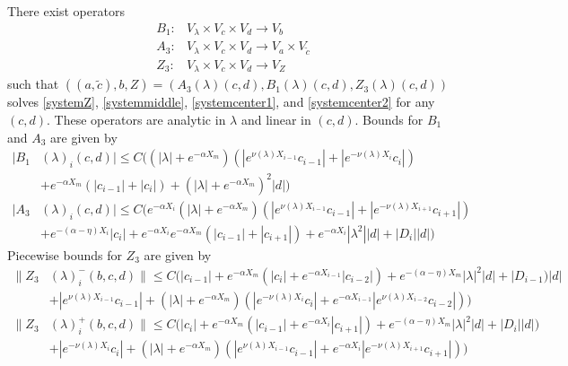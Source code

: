 \documentclass[thesis.tex]{subfiles}
\begin{document}
\begin{lemma}\label{Zinv2}
There exist operators
\begin{align*}
B_1: &V_\lambda \times V_c \times V_d \rightarrow V_b \\
A_3: &V_\lambda \times V_c \times V_d \rightarrow V_a \times V_{\tilde{c}} \\
Z_3: &V_\lambda \times V_c \times V_d \rightarrow V_Z
\end{align*}
such that $( (a, \tilde{c}) , b, Z ) = ( A_3(\lambda)(c, d), B_1(\lambda)(c, d), Z_3(\lambda)(c, d) )$ solves \eqref{systemZ}, \eqref{systemmiddle}, \eqref{systemcenter1}, and \eqref{systemcenter2} for any $(c, d)$. These operators are analytic in $\lambda$ and linear in $(c, d)$. Bounds for $B_1$ and $A_3$ are given by
\begin{align}
|B_1&(\lambda)_i(c, d)| \leq C \Big( (|\lambda| + e^{-\alpha X_m})(|e^{\nu(\lambda)X_{i-1}} c_{i-1}| + |e^{-\nu(\lambda)X_i} c_i|) \nonumber \\
&+ e^{-\alpha X_m}(|c_{i-1}| + |c_i|) + (|\lambda| + e^{-\alpha X_m})^2 |d|  \Big)\label{B1bound} \\
|A_3&(\lambda)_i(c, d)|
\leq C \Big(  
e^{-\alpha X_i} (|\lambda| + e^{-\alpha X_m})(|e^{\nu(\lambda)X_{i-1}} c_{i-1}| + |e^{-\nu(\lambda)X_{i+1}}c_{i+1}|) \nonumber \\
&+ e^{-(\alpha - \eta)X_i}|c_i| + e^{-\alpha X_i} e^{-\alpha X_m}(|c_{i-1}| + |c_{i+1}|) + e^{-\alpha X_i} |\lambda^2||d| + |D_i||d| \Big) \label{A3bound}
\end{align} 
Piecewise bounds for $Z_3$ are given by
\begin{equation}\label{Z3bound}
\begin{aligned}
\| Z_3&(\lambda)_i^-(b,c,d) \| \leq C\Big(|c_{i-1}| + e^{-\alpha X_m}(|c_i| + e^{-\alpha X_{i-1}} |c_{i-2}|) + e^{-(\alpha - \eta) X_m}|\lambda|^2|d| + |D_{i-1})|d| \\
&+ |e^{\nu(\lambda)X_{i-1}}c_{i-1}| + (|\lambda| + e^{-\alpha X_m})(|e^{-\nu(\lambda)X_i} c_i| + e^{-\alpha X_{i-1}} |e^{\nu(\lambda)X_{i-2}} c_{i-2}|)\Big) \\
\| Z_3&(\lambda)_i^+(b,c,d) \| \leq C\Big(|c_i| + e^{-\alpha X_m}(|c_{i-1}| + e^{-\alpha X_i} |c_{i+1}|) + e^{-(\alpha - \eta) X_m}|\lambda|^2|d| + |D_i||d|) \\
&+ |e^{-\nu(\lambda)X_i} c_i| + (|\lambda| + e^{-\alpha X_m})(|e^{\nu(\lambda)X_{i-1}} c_{i-1}| + e^{-\alpha X_i} |e^{-\nu(\lambda)X_{i+1}} c_{i+1}|)\Big)
\end{aligned}
\end{equation}

\end{lemma}
\end{document}
